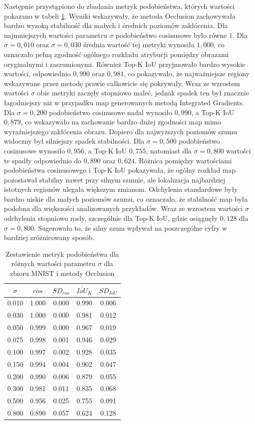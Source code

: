 Następnie przystąpiono do zbadania metryk podobieństwa, których wartości pokazano w tabeli \ref{tab:occ_sg_cos_topk_mnist}. Wyniki wskazywały, że metoda Occlusion zachowywała bardzo wysoką stabilność dla małych i średnich poziomów zakłócenia. Dla najmniejszych wartości parametru $\sigma$ podobieństwo cosinusowe było równe $1$. Dla $\sigma = 0{,}010$ oraz $\sigma = 0{,}030$ średnia wartość tej metryki wynosiła $1{,}000$, co oznaczało pełną zgodność ogólnego rozkładu atrybucji pomiędzy obrazami oryginalnymi i zaszumionymi. Również Top-K IoU przyjmowało bardzo wysokie wartości, odpowiednio $0{,}990$ oraz $0{,}981$, co pokazywało, że najważniejsze regiony wskazywane przez metodę prawie całkowicie się pokrywały. Wraz ze wzrostem wartości $\sigma$ obie metryki zaczęły stopniowo maleć, jednak spadek ten był znacznie łagodniejszy niż w przypadku map generowanych metodą Integrated Gradients. Dla $\sigma = 0{,}200$ podobieństwo cosinusowe nadal wynosiło $0{,}990$, a Top-K IoU $0{,}879$, co wskazywało na zachowanie bardzo dużej zgodności map mimo wyraźniejszego zakłócenia obrazu. Dopiero dla najwyższych poziomów szumu widoczny był silniejszy spadek stabilności. Dla $\sigma = 0{,}500$ podobieństwo cosinusowe wynosiło $0{,}956$, a Top-K IoU $0{,}755$, natomiast dla $\sigma = 0{,}800$ wartości te spadły odpowiednio do $0{,}890$ oraz $0{,}624$. Różnica pomiędzy wartościami podobieństwa cosinusowego i Top-K IoU pokazywała, że ogólny rozkład map pozostawał stabilny nawet przy silnym szumie, ale lokalizacja najbardziej istotnych regionów ulegała większym zmianom. Odchylenia standardowe były bardzo niskie dla małych poziomów szumu, co oznaczało, że stabilność map była podobna dla większości analizowanych przykładów. Wraz ze wzrostem wartości $\sigma$ odchylenia stopniowo rosły, szczególnie dla Top-K IoU, gdzie osiągnęły $0{,}128$ dla $\sigma = 0{,}800$. Sugerowało to, że silny szum wpływał na poszczególne cyfry w bardziej zróżnicowany sposób.

\begin{table}[H] \centering \caption{Zestawienie metryk podobieństwa dla różnych wartości parametru \(\sigma\) dla zbioru MNIST i metody Occlusion} \label{tab:occ_sg_cos_topk_mnist} \begin{tabular}{ccccc} \toprule $\sigma$ & $\overline{cos}$ & $SD_{cos}$ & $\overline{IoU}_{K}$ & $SD_{IoU}$ \\ \midrule 0.010 & 1.000 & 0.000 & 0.990 & 0.006 \\ 0.030 & 1.000 & 0.000 & 0.981 & 0.012 \\ 0.050 & 0.999 & 0.000 & 0.967 & 0.019 \\ 0.075 & 0.998 & 0.001 & 0.946 & 0.029 \\ 0.100 & 0.997 & 0.002 & 0.928 & 0.035 \\ 0.150 & 0.994 & 0.004 & 0.902 & 0.047 \\ 0.200 & 0.990 & 0.006 & 0.879 & 0.055 \\ 0.300 & 0.981 & 0.011 & 0.835 & 0.068 \\ 0.500 & 0.956 & 0.025 & 0.755 & 0.091 \\ 0.800 & 0.890 & 0.057 & 0.624 & 0.128 \\ \bottomrule \end{tabular} \end{table}

